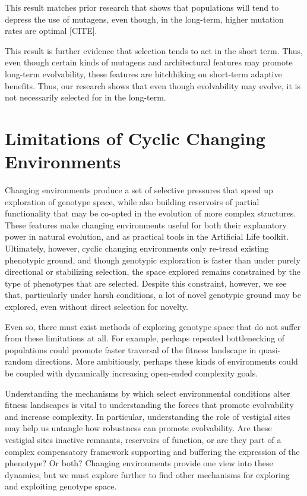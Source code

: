 \documentclass[PhD]{msu-thesis}
\begin{document}
This result matches prior research that shows that populations will tend to depress the use of mutagens, even though, in the long-term, higher mutation rates are optimal [CITE].  

This result is further evidence that selection tends to act in the short term. Thus, even though certain kinds of mutagens and architectural features may promote long-term evolvability, these features are hitchhiking on short-term adaptive benefits. Thus, our research shows that even though evolvability may evolve, it is not necessarily selected for in the long-term. 

\section{Limitations of Cyclic Changing Environments}
Changing environments produce a set of selective pressures that speed up exploration of genotype space, while also building reservoirs of partial functionality that may be co-opted in the evolution of more complex structures. These features make changing environments useful for both their explanatory power in natural evolution, and as practical tools in the Artificial Life toolkit.
Ultimately, however, cyclic changing environments only re-tread existing phenotypic ground, and though genotypic exploration is faster than under purely directional or stabilizing selection, the space explored remains constrained by the type of phenotypes that are selected. Despite this constraint, however, we see that, particularly under harsh conditions, a lot of novel genotypic ground may be explored, even without direct selection for novelty. 

Even so, there must exist methods of exploring genotype space that do not suffer from these limitations at all.
For example, perhaps repeated bottlenecking of populations could promote faster traversal of the fitness landscape in quasi-random directions. More ambitiously, perhaps these kinds of environments could be coupled with dynamically increasing open-ended complexity goals.

Understanding the mechanisms by which select environmental conditions alter fitness landscapes is vital to understanding the forces that promote evolvability and increase complexity. In particular, understanding the role of vestigial sites may help us untangle how robustness can promote evolvability. Are these vestigial sites inactive remnants, reservoirs of function, or are they part of a complex compensatory framework supporting and buffering the expression of the phenotype? Or both? Changing environments provide one view into these dynamics, but we must explore further to find other mechanisms for exploring and exploiting genotype space.
\end{document}
